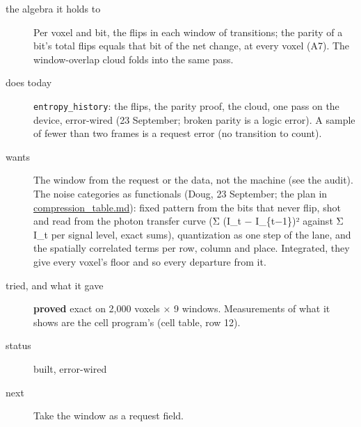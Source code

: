 \begin{description}
\item[{the algebra it holds to}] Per voxel and bit, the flips in each window of transitions; the parity of a bit's total flips equals that bit of the net change, at every voxel (A7). The window-overlap cloud folds into the same pass.
\item[{does today}] \texttt{entropy\_\allowbreak{}history}: the flips, the parity proof, the cloud, one pass on the device, error-wired (23 September; broken parity is a logic error). A sample of fewer than two frames is a request error (no transition to count).
\item[{wants}] The window from the request or the data, not the machine (see the audit). The noise categories as functionals (Doug, 23 September; the plan in \hyperref[chap:compression-table]{compression\_\allowbreak{}table.md}): fixed pattern from the bits that never flip, shot and read from the photon transfer curve (Σ (I\_\allowbreak{}t − I\_\allowbreak{}\{t−1\})² against Σ I\_\allowbreak{}t per signal level, exact sums), quantization as one step of the lane, and the spatially correlated terms per row, column and place. Integrated, they give every voxel's floor and so every departure from it.
\item[{tried, and what it gave}] \textbf{proved} exact on 2,000 voxels × 9 windows. Measurements of what it shows are the cell program's (cell table, row 12).
\item[{status}] built, error-wired
\item[{next}] Take the window as a request field.
\end{description}

